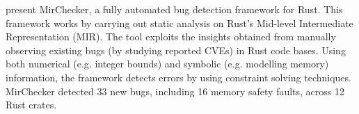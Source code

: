 \cite{li2021mirchecker} present MirChecker, a fully automated bug detection framework for Rust. This framework works by carrying out static analysis on Rust's Mid-level Intermediate Representation (MIR). The tool exploits the insights obtained from manually observing existing bugs (by studying reported CVEs) in Rust code bases. Using both numerical (e.g. integer bounds) and symbolic (e.g. modelling memory) information, the framework detects errors by using constraint solving techniques. MirChecker detected 33 new bugs, including 16 memory safety faults, across 12 Rust crates.

